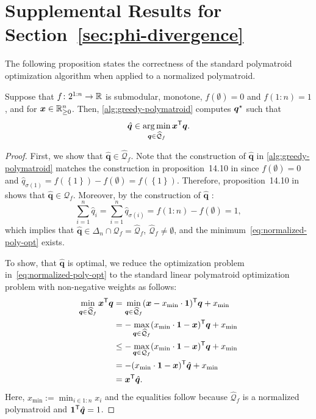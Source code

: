 \documentclass[10pt]{article} %
\DeclareMathOperator*{\argmin}{arg\,min}
\begin{document}
\section{Supplemental Results for Section~\ref{sec:phi-divergence}}

The following proposition states the correctness of the standard polymatroid optimization algorithm when applied to a normalized polymatroid. 
\begin{proposition} \label{prop:standard-polymatroid-works}
Suppose that $f\colon  2^{1{:}n} \to \mathbb{R}$ is submodular, monotone, $f(\emptyset) = 0$ and $f(1{:}n) = 1$, and for $\bm{x}\in \mathbb{R}^n_{\ge 0}$. Then, \cref{alg:greedy-polymatroid} computes $\bm{q}^{\mathnormal{\star}}$ such that
  \begin{equation} \label{eq:normalized-poly-opt}
    \hat{\bm{q}}  \in  \argmin_{\bm{q}\in \widehat{\mathcal{Q}}_f}  \bm{x}\tr \bm{q}.
\end{equation}
\end{proposition}
\begin{proof}
First, we show that $\hat{\bm{q}} \in \widehat{\mathcal{Q}}_f$. Note that the construction of $\hat{\bm{q}}$ in \cref{alg:greedy-polymatroid} matches the construction in proposition~14.10 in \citet{Korte2012} since $f(\emptyset) = 0$ and $\hat{q}_{\sigma(1)} = f(\left\{ 1 \right\}) - f(\emptyset) = f(\left\{ 1 \right\})$. Therefore, proposition~14.10 in \citet{Korte2012} shows that $\hat{\bm{q}}  \in \mathcal{Q}_f$. Moreover, by the construction of $\hat{\bm{q}}$ :
  \[
   \sum_{i=1}^n \hat{q}_i =  
   \sum_{i=1}^n \hat{q}_{\sigma (i)} = f(1{:}n) - f(\emptyset) = 1, 
  \]
which implies that $\hat{\bm{q}} \in \Delta_n \cap \mathcal{Q}_f = \widehat{\mathcal{Q}}_f$, $\widehat{\mathcal{Q}}_f \neq \emptyset$, and the minimum~\eqref{eq:normalized-poly-opt} exists.

To show, that $\hat{\bm{q}} $ is optimal, we reduce the optimization problem in~\eqref{eq:normalized-poly-opt} to the standard linear polymatroid optimization problem with non-negative weights as follows:
\begin{align*}
  \min_{\bm{q}\in \widehat{\mathcal{Q}}_f}  \bm{x}^{\mathsf{T}} \bm{q}
  &= \min_{\bm{q}\in \widehat{\mathcal{Q}}_f}  (\bm{x} - x_{\min}\cdot \bm{1}) ^{\mathsf{T}} \bm{q} +  x_{\min}\\
  &= -\max_{\bm{q}\in \widehat{\mathcal{Q}}_f}  (x_{\min}\cdot \bm{1} - \bm{x}) ^{\mathsf{T}} \bm{q} + x_{\min}\\
  &\le -\max_{\bm{q}\in \mathcal{Q}_f}  (x_{\min}\cdot \bm{1} - \bm{x}) ^{\mathsf{T}} \bm{q} + x_{\min}\\
  &= - (x_{\min}\cdot \bm{1} - \bm{x}) ^{\mathsf{T}} \hat{\bm{q}} + x_{\min} \\
  &=  \bm{x}^{\mathsf{T}} \hat{\bm{q}}.
\end{align*}
Here, $x_{\min} := \min_{i\in 1{:}n} x_i $ and the equalities follow because $\widehat{\mathcal{Q}}_f$ is a normalized polymatroid and $\bm{1}^{\mathsf{T}} \hat{\bm{q}} = 1$.
\end{proof}
\end{document}

